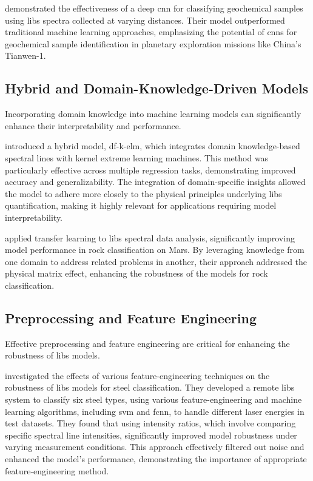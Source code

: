 \citet{yangConvolutionalNeuralNetwork2022} demonstrated the effectiveness of a deep \gls{cnn} for classifying geochemical samples using \gls{libs} spectra collected at varying distances.
Their model outperformed traditional machine learning approaches, emphasizing the potential of \gls{cnn}s for geochemical sample identification in planetary exploration missions like China's Tianwen-1.

\subsection{Hybrid and Domain-Knowledge-Driven Models}
Incorporating domain knowledge into machine learning models can significantly enhance their interpretability and performance.

\citet{song_DF-K-ELM} introduced a hybrid model, \gls{df}-\gls{k-elm}, which integrates domain knowledge-based spectral lines with kernel extreme learning machines.
This method was particularly effective across multiple regression tasks, demonstrating improved accuracy and generalizability.
The integration of domain-specific insights allowed the model to adhere more closely to the physical principles underlying \gls{libs} quantification, making it highly relevant for applications requiring model interpretability.

\citet{sunMachineLearningTransfer2021} applied transfer learning to \gls{libs} spectral data analysis, significantly improving model performance in rock classification on Mars.
By leveraging knowledge from one domain to address related problems in another, their approach addressed the physical matrix effect, enhancing the robustness of the models for rock classification.

\subsection{Preprocessing and Feature Engineering}
Effective preprocessing and feature engineering are critical for enhancing the robustness of \gls{libs} models.

\citet{jeonEffectsFeatureEngineering2024} investigated the effects of various feature-engineering techniques on the robustness of \gls{libs} models for steel classification.
They developed a remote \gls{libs} system to classify six steel types, using various feature-engineering and machine learning algorithms, including \gls{svm} and \gls{fcnn}, to handle different laser energies in test datasets.
They found that using intensity ratios, which involve comparing specific spectral line intensities, significantly improved model robustness under varying measurement conditions.
This approach effectively filtered out noise and enhanced the model's performance, demonstrating the importance of appropriate feature-engineering method.

